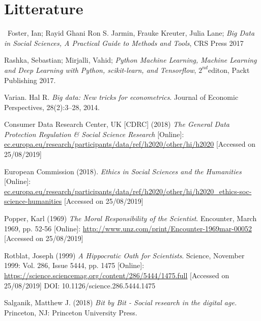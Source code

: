 \documentclass[12pt,a4paper]{article}
\begin{document}
\newpage
\section{Litterature}
\ Foster, Ian; Rayid Ghani Ron S. Jarmin, Frauke Kreuter, Julia Lane; \textit{Big Data in Social Sciences, A Practical Guide to Methods and Tools}, CRS Press 2017 \newline

Rashka, Sebastian; Mirjalli, Vahid; \textit{Python Machine Learning, Machine Learning and Deep Learning with Python, scikit-learn, and Tensorflow}, $2^{nd}$editon, Packt Publishing 2017. \newline

Varian. Hal R. \textit{Big data: New tricks for econometrics}. Journal of Economic Perspectives, 28(2):3–28, 2014. \newline

Consumer Data Research Center, UK  [CDRC] (2018) \textit{The General Data Protection Regulation \& Social Science Research} [Online]: \newline\href{https://ec.europa.eu/research/participants/data/ref/h2020/other/hi/h2020ethics-soc-science-humanities_en.pdf}{ec.europa.eu/research/participants/data/ref/h2020/other/hi/h2020} [Accessed on 25/08/2019]\newline

European Commission (2018). \textit{Ethics in Social Sciences and the Humanities} [Online]: \href{https://ec.europa.eu/research/participants/data/ref/h2020/other/hi/h2020_ethics-soc-science-humanities_en.pdf}{ec.europa.eu/research/participants/data/ref/h2020/other/hi/h2020\_ethics-soc-science-humanities} [Accessed on 25/08/2019] \newline

Popper, Karl (1969) \textit{The Moral Responsibility of the Scientist}. Encounter, March 1969, pp. 52-56 [Online]: \href{http://www.unz.com/print/Encounter-1969mar-00052}{http://www.unz.com/print/Encounter-1969mar-00052} [Accessed on 25/08/2019]\newline

Rotblat, Joseph (1999) \textit{A Hippocratic Oath for Scientists}. Science, November 1999: Vol. 286, Issue 5444, pp. 1475 [Online]: \href{https://science.sciencemag.org/content/286/5444/1475.full}{https://science.sciencemag.org/content/286/5444/1475.full} [Accessed on 25/08/2019] DOI: 10.1126/science.286.5444.1475 \newline
 
Salganik, Matthew J. (2018) \textit{Bit by Bit - Social research in the digital age.} Princeton, NJ: Princeton University Press.\newline
\end{document}
